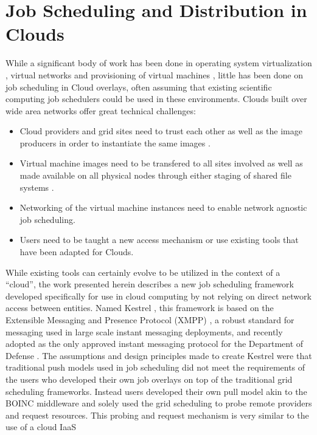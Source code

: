 \section{Job Scheduling and Distribution in Clouds}
While a significant body of work has been done in operating system
virtualization \cite{Barham2003}, virtual networks \cite{Tsugawa2006,Ganguly2006}
and provisioning of virtual machines \cite{Keahey2008,Sotomayor2009,Nurmi2009},
little has been done on job scheduling in Cloud overlays, often assuming
that existing scientific computing job schedulers could be used in
these environments. Clouds built over wide area networks offer great
technical challenges:
\begin{itemize}
\item Cloud providers and grid sites need to trust each other as well as
the image producers in order to instantiate the same images \cite{B'egin2008}.
\item Virtual machine images need to be transfered to all sites involved
as well as made available on all physical nodes through either staging
of shared file systems \cite{Schmidt2010}.
\item Networking of the virtual machine instances need to enable network
agnostic job scheduling.
\item Users need to be taught a new access mechanism or use existing tools
that have been adapted for Clouds.
\end{itemize}
While existing tools \cite{Tannenbaum2001,Deelman2009,Oinn2004,Wilde2009}
can certainly evolve to be utilized in the context of a ``cloud'', the work
presented herein describes a new job scheduling framework developed specifically
for use in cloud computing by not relying on direct network access between
entities. Named Kestrel \cite{Stout2009, Stout10}, this framework is based on
the Extensible Messaging and Presence Protocol (XMPP) \cite{RFC3920, RFC3921}, a
robust standard for messaging used in large scale instant messaging deployments,
and recently adopted as the only approved instant messaging protocol for the
Department of Defense \cite{DoDXMPP}. The assumptions and design principles
made to create Kestrel were that traditional push models used in job scheduling
did not meet the requirements of the users who developed their own job overlays
on top of the traditional grid scheduling frameworks. Instead users developed
their own pull model akin to the BOINC \cite{Anderson2004} middleware and solely
used the grid scheduling to probe remote providers and request resources.
This probing and request mechanism is very similar to the use of a cloud IaaS
